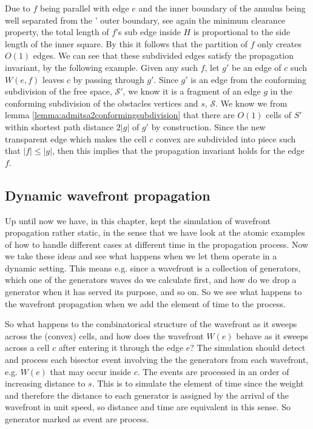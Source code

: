 Due to $f$ being parallel with edge $e$ and the inner boundary of the annulus being well separated from the '
outer boundary, see again the minimum clearance property, the total length of $f$'s sub edge inside $H$ is 
proportional to the side length of the inner square. By this it follows that the partition of $f$ only creates 
$O(1)$ edges. We can see that these subdivided edges satisfy the propagation invariant, by the following example. 
Given any such $f$, let $g'$ be an edge of $c$ such $W(e,f)$ leaves $c$ by passing through $g'$. Since $g'$ is an 
edge from the conforming subdivision of the free space, $\mathcal{S}'$, we know it is a fragment of an edge $g$ in 
the conforming subdivision of the obstacles vertices and $s$, $\mathcal{S}$. We know we from lemma 
\ref{lemma:admitsa2conformingsubdivision} that there are $O(1)$ cells of $S'$ within shortest path distance $2|g|$ 
of $g'$ by construction. Since the new transparent edge which makes the cell $c$ convex are subdivided into piece 
such that $|f| \leq |g|$, then this implies that the propagation invariant holds for the edge $f$.

\subsection{Dynamic wavefront propagation} \label{section:dynamicwavefront}

Up until now we have, in this chapter, kept the simulation of wavefront propagation rather static, in the sense that
we have look at the atomic examples of how to handle different cases at different time in the propagation process.
Now we take these ideas and see what happens when we let them operate in a dynamic setting. This means e.g. 
since a wavefront is a collection of generators, which one of the generators waves do we calculate first, and how do
we drop a generator when it has served its purpose, and so on. So we see what happens to the wavefront propagation 
when we add the element of time to the process.

So what happens to the combinatorical structure of the wavefront as it sweeps across the (convex) cells, and how 
does the wavefront $W(e)$ behave as it sweeps across a cell $c$ after entering it through the edge $e$? The 
simulation should detect and process each bisector event involving the the generators from each wavefront, e.g. 
$W(e)$ that may occur inside $c$. The events are processed in an order of increasing distance to $s$. This is to 
simulate the element of time since the weight and therefore the distance to each generator is assigned by the 
arrival of the wavefront in unit speed, so distance and time are equivalent in this sense. So generator marked as 
event are process.

